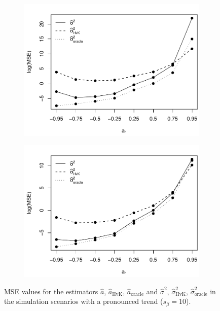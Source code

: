 \begin{figure}[t!]
\begin{subfigure}[b]{0.475\textwidth}
\includegraphics[width=\textwidth]{Plots/MSE_lrv_T=250_slope=10_(q,K1,K2,M1,M2)=(25,2,10,20,30).pdf}
\end{subfigure}\hspace{0.25cm}
\begin{subfigure}[b]{0.475\textwidth}
\includegraphics[width=\textwidth]{Plots/MSE_lrv_T=500_slope=10_(q,K1,K2,M1,M2)=(25,2,10,20,30).pdf}
\end{subfigure}
\caption{MSE values for the estimators $\widehat{a}$, $\widehat{a}_{\text{HvK}}$, $\widehat{a}_{\text{oracle}}$ and $\widehat{\sigma}^2$, $\widehat{\sigma}^2_{\text{HvK}}$, $\widehat{\sigma}^2_{\text{oracle}}$ in the simulation scenarios with a pronounced trend ($s_\beta=10$).}\label{fig:MSE_slope10}
\end{figure}


